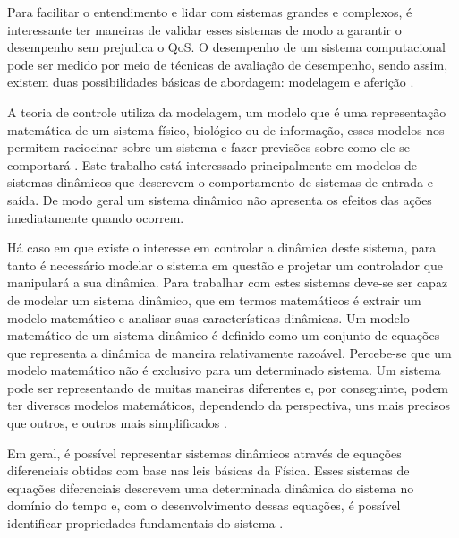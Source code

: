 Para facilitar o entendimento e lidar com sistemas grandes e complexos, é interessante ter maneiras de validar esses sistemas de modo a garantir o desempenho sem prejudica o QoS. O desempenho de um sistema computacional pode ser medido por meio de técnicas de avaliação de desempenho, sendo assim, existem duas possibilidades básicas de abordagem: modelagem e aferição \cite{Jain1991}.

A teoria de controle utiliza da modelagem, um modelo que é uma representação matemática de um sistema físico, biológico ou de informação, esses modelos nos permitem raciocinar sobre um sistema e fazer previsões sobre como ele se comportará \cite{Karl2008}. Este trabalho está interessado principalmente em modelos de sistemas dinâmicos que descrevem o comportamento de sistemas de entrada e saída. De modo geral um sistema dinâmico não apresenta os efeitos das ações imediatamente quando ocorrem. %

Há caso em que existe o interesse em controlar a dinâmica deste sistema, para tanto é necessário modelar o sistema em questão e projetar um controlador que manipulará a sua dinâmica. Para trabalhar com estes sistemas deve-se ser capaz de modelar um sistema dinâmico, que em termos matemáticos é extrair um modelo matemático e analisar suas características dinâmicas. Um modelo matemático de um sistema dinâmico é definido como um conjunto de equações que representa a dinâmica de maneira relativamente razoável. Percebe-se que um modelo matemático não é exclusivo para um determinado sistema. Um sistema pode ser representando de muitas maneiras diferentes e, por conseguinte, podem ter diversos modelos matemáticos, dependendo da perspectiva, uns mais precisos que outros, e outros mais simplificados \cite{Ogata2001}.

Em geral, é possível representar sistemas dinâmicos através de equações diferenciais obtidas com base nas leis básicas da Física. Esses sistemas de equações diferenciais descrevem uma determinada dinâmica do sistema no domínio do tempo e, com o desenvolvimento dessas equações, é possível identificar propriedades fundamentais do sistema \cite{Nobile2013}.


